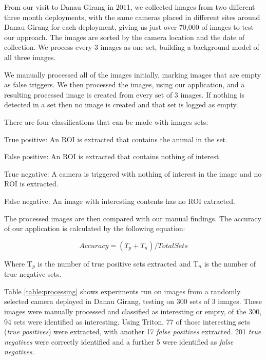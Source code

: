		From our visit to Danau Girang in 2011, we collected images from two different three month deployments, with the same cameras placed in different sites around Danau Girang for each deployment, giving us just over 70,000 of images to test our approach. The images are sorted by the camera location and the date of collection. We process every 3 images as one set, building a background model of all three images.
		
		We manually processed all of the images initially, marking images that are empty as false triggers. We then processed the images, using our application, and a resulting processed image is created from every set of 3 images. If nothing is detected in a set then no image is created and that set is logged as empty. 
		
		There are four classifications that can be made with images sets:
		\begin{description}
			\item True positive: An ROI is extracted that contains the animal in the set.
			\item False positive: An ROI is extracted that contains nothing of interest.
			\item True negative: A camera is triggered with nothing of interest in the image and no ROI is extracted.
			\item False negative: An image with interesting contents has no ROI extracted.
		\end{description}
		
		The processed images are then compared with our manual findings. The accuracy of our application is calculated by the following equation:
		
		\begin{equation}Accuracy = (T_{p} + T_{n})/Total Sets\end{equation}
		
		Where T$_{p}$  is the number of true positive sets extracted and T$_{n}$  is the number of true negative sets.
		
		Table \ref{table:processing} shows experiments run on images from a randomly selected camera deployed in Danau Girang, testing on 300 sets of 3 images. These images were manually processed and classified as interesting or empty, of the 300, 94 sets were identified as interesting. Using Triton, 77 of those interesting sets (\textit{true positives}) were extracted, with another 17 \textit{false positives} extracted. 201 \textit{true negatives} were correctly identified and a further 5 were identified as \textit{false negatives}. 
		
